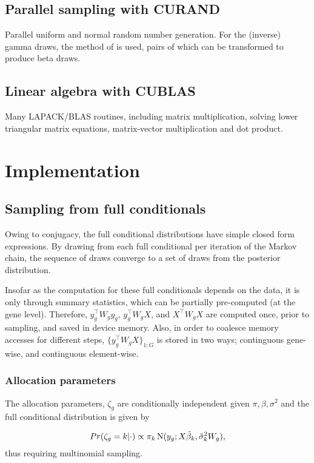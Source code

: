 \subsection{Parallel sampling with CURAND}
Parallel uniform and normal random number generation. For the (inverse) gamma draws, the method of \citet{simplegamma} is used, pairs of which can be transformed to produce beta draws.

\subsection{Linear algebra with CUBLAS}
Many LAPACK/BLAS routines, including matrix multiplication, solving lower triangular matrix equations, matrix-vector multiplication and dot product.


\section{Implementation}
\label{sec:implement}
\subsection{Sampling from full conditionals}
\label{subsec:fullcond}
Owing to conjugacy, the full conditional distributions have simple closed form expressions. By drawing from each full conditional per iteration of the Markov chain, the sequence of draws converge to a set of draws from the posterior distribution.

Insofar as the computation for these full conditionals depends on the data, it is only through summary statistics, which can be partially pre-computed (at the gene level). Therefore, $y_g^\top W_g y_g$, $y_g^\top W_g X$, and $X^\top W_g X$ are computed once, prior to sampling, and saved in device memory. Also, in order to coalesce memory accesses for different steps, $\{y_g^\top W_g X\}_{1:G}$ is stored in two ways; continguous gene-wise, and continguous
element-wise.

\subsubsection{Allocation parameters}
The allocation parameters, $\zeta_g$ are conditionally independent given $\pi, \beta, \sigma^2$ and the full conditional distribution is given by

\begin{equation}
\label{zetafull}
Pr(\zeta_g=k|\cdot) \propto \pi_k \operatorname{N}(y_g;X\tilde{\beta}_k,\tilde{\sigma}_k^2 W_g),
\end{equation}
thus requiring multinomial sampling.

